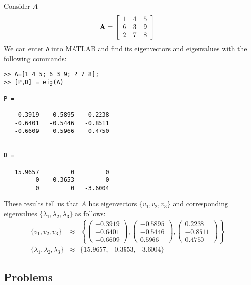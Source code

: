 \begin{example}
Consider $A$
\begin{equation}
{\bf A} = \left[
\begin{array}{ccc}
1 & 4 & 5 \\
6 & 3 & 9 \\
2 & 7 & 8
\end{array}
\right]
\end{equation}
We can enter {\tt A} into MATLAB and find its eigenvectors and
eigenvalues with the following commands:
\begin{verbatim}
>> A=[1 4 5; 6 3 9; 2 7 8];
>> [P,D] = eig(A)

P =

   -0.3919   -0.5895    0.2238
   -0.6401   -0.5446   -0.8511
   -0.6609    0.5966    0.4750


D =

   15.9657         0         0
         0   -0.3653         0
         0         0   -3.6004
\end{verbatim}

These results tell us that $A$ has eigenvectors $\lbrace
v_{1},v_{2},v_{3}\rbrace$ and corresponding eigenvalues $\lbrace
\lambda_{1},\lambda_{2},\lambda_{3}\rbrace$ as follows:
\begin{eqnarray*}
\lbrace v_{1},v_{2},v_{3}\rbrace &\approx&
\left\lbrace
\left( \begin{array}{c}
-0.3919 \\
-0.6401 \\
-0.6609
\end{array}
\right),
\left( \begin{array}{c}
-0.5895 \\
-0.5446 \\
0.5966
\end{array}
\right),
\left( \begin{array}{c}
0.2238 \\
-0.8511 \\
0.4750
\end{array}
\right) \right\rbrace \\ \lbrace
\lambda_{1},\lambda_{2},\lambda_{3}\rbrace &\approx & \lbrace 15.9657,
-0.3653, -3.6004 \rbrace
\end{eqnarray*}
\end{example}

\subsection{Problems}

